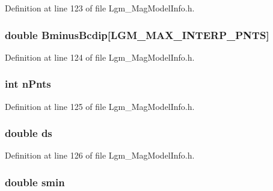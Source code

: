 Definition at line 123 of file Lgm\_\-MagModelInfo.h.\hypertarget{struct_lgm___mag_model_info_d3f3c09afc338a28ddb1213be42a4ca7}{
\subsubsection[{BminusBcdip}]{\setlength{\rightskip}{0pt plus 5cm}double {\bf BminusBcdip}\mbox{[}LGM\_\-MAX\_\-INTERP\_\-PNTS\mbox{]}}}
\label{struct_lgm___mag_model_info_d3f3c09afc338a28ddb1213be42a4ca7}




Definition at line 124 of file Lgm\_\-MagModelInfo.h.\hypertarget{struct_lgm___mag_model_info_e64e724dd0713b2ba2fca5aedab3fd34}{
\subsubsection[{nPnts}]{\setlength{\rightskip}{0pt plus 5cm}int {\bf nPnts}}}
\label{struct_lgm___mag_model_info_e64e724dd0713b2ba2fca5aedab3fd34}




Definition at line 125 of file Lgm\_\-MagModelInfo.h.\hypertarget{struct_lgm___mag_model_info_ac2192aa882430a630cad1a1b5131a29}{
\subsubsection[{ds}]{\setlength{\rightskip}{0pt plus 5cm}double {\bf ds}}}
\label{struct_lgm___mag_model_info_ac2192aa882430a630cad1a1b5131a29}




Definition at line 126 of file Lgm\_\-MagModelInfo.h.\hypertarget{struct_lgm___mag_model_info_588dcb85c838ec933ddca7fd85319356}{
\subsubsection[{smin}]{\setlength{\rightskip}{0pt plus 5cm}double {\bf smin}}}
\label{struct_lgm___mag_model_info_588dcb85c838ec933ddca7fd85319356}




